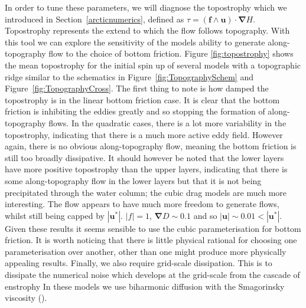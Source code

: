 \documentclass[12pt,a4paper]{report}
\newcommand*\figref[1]{Figure~\ref{#1}}
\newcommand*\secref[1]{Section~\ref{#1}}
\begin{document}
  In order to tune these parameters, we will diagnose the
  topostrophy which we introduced in \secref{arcticnumerics},
  defined as
  $\tau = \left(\boldsymbol{ f } \wedge
  \boldsymbol{ u } \right) \cdot \boldsymbol{\nabla} H $. 
  Topostrophy represents the extend to which the flow
  follows topography. With this tool we can explore the sensitivity of the models
  ability to generate along-topography flow to the choice of bottom friction. 
  Figure \ref{fig:topostrophy} shows the mean topostrophy for the
  initial spin up of several models with a topographic ridge similar to
  the schematics in \figref{fig:TopographySchem} and
	\figref{fig:TopographyCross}. The first thing to note is how damped the 
  topostrophy is in the linear
  bottom friction case. It is clear that the bottom friction is inhibiting the 
  eddies greatly and so stopping the formation of along-topography flows. In
  the quadratic cases, there is a lot more variability in the topostrophy, indicating
  that there is a much more active eddy field. However again, there is no obvious
  along-topography flow, meaning the bottom friction is still too broadly dissipative.
  It should however be noted that the lower layers have more positive topostrophy than
  the upper layers, indicating that there is some along-topography flow in the lower 
  layers but that it is not being precipitated  through the water column;
  the cubic drag models are much more interesting. The flow appears to have much more
  freedom to generate flows, whilst still being capped by $\left|\boldsymbol{u}^{\ast}\right|$. $\left|f\right| = 1$, $\boldsymbol{\nabla} D \sim 0.1$ and so $\left|\boldsymbol{u}\right| \sim 0.01 < \left|\boldsymbol{u}^{\ast}\right|$.
  Given these results it seems sensible to use the cubic parameterisation for bottom 
  friction. It is worth noticing that there is little physical rational for choosing
  one parameterisation over another, other than one might produce more physically 
  appealing results. Finally, we also require grid-scale dissipation. This is to dissipate the
  numerical noise which develops at the grid-scale from the cascade of enstrophy
  In these models we use biharmonic diffusion with the Smagorinsky viscosity (\cite{smagorinsky1963general}). 
  
\end{document}
